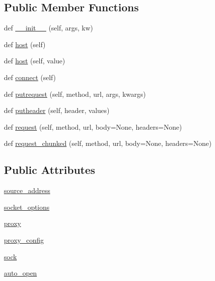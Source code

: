 \subsection*{Public Member Functions}
\begin{DoxyCompactItemize}
\item 
def \hyperlink{classpip_1_1__vendor_1_1urllib3_1_1connection_1_1HTTPConnection_ad63fe1e5e68008fee982ea14c3f31606}{\+\_\+\+\_\+init\+\_\+\+\_\+} (self, args, kw)
\item 
def \hyperlink{classpip_1_1__vendor_1_1urllib3_1_1connection_1_1HTTPConnection_ad3b2b3f74cfd3ac1d9288c40e86dbfca}{host} (self)
\item 
def \hyperlink{classpip_1_1__vendor_1_1urllib3_1_1connection_1_1HTTPConnection_a68587ff6bb26a75d8bea4a96dd1237f3}{host} (self, value)
\item 
def \hyperlink{classpip_1_1__vendor_1_1urllib3_1_1connection_1_1HTTPConnection_a303347a3223952a6860e9d3ae44a2ba3}{connect} (self)
\item 
def \hyperlink{classpip_1_1__vendor_1_1urllib3_1_1connection_1_1HTTPConnection_a611c9e37436696a1af29ac624ea77def}{putrequest} (self, method, url, args, kwargs)
\item 
def \hyperlink{classpip_1_1__vendor_1_1urllib3_1_1connection_1_1HTTPConnection_a9ca92a84ad051041cfd318c6e08d39cd}{putheader} (self, header, values)
\item 
def \hyperlink{classpip_1_1__vendor_1_1urllib3_1_1connection_1_1HTTPConnection_ae44707607a133fa0d27085cc2ea9ef85}{request} (self, method, url, body=None, headers=None)
\item 
def \hyperlink{classpip_1_1__vendor_1_1urllib3_1_1connection_1_1HTTPConnection_ad0ce9861382a0268d64ee1d58d3d83c4}{request\+\_\+chunked} (self, method, url, body=None, headers=None)
\end{DoxyCompactItemize}
\subsection*{Public Attributes}
\begin{DoxyCompactItemize}
\item 
\hyperlink{classpip_1_1__vendor_1_1urllib3_1_1connection_1_1HTTPConnection_abd9f28f7d024b3e544e7b3d3bb9d8a77}{source\+\_\+address}
\item 
\hyperlink{classpip_1_1__vendor_1_1urllib3_1_1connection_1_1HTTPConnection_ad4e19482415e22a06e228552ada6f142}{socket\+\_\+options}
\item 
\hyperlink{classpip_1_1__vendor_1_1urllib3_1_1connection_1_1HTTPConnection_a70e46c5372379c8b6635dc4b618d7ee4}{proxy}
\item 
\hyperlink{classpip_1_1__vendor_1_1urllib3_1_1connection_1_1HTTPConnection_aafe0298528579b9eb8c0c72f6b8504e6}{proxy\+\_\+config}
\item 
\hyperlink{classpip_1_1__vendor_1_1urllib3_1_1connection_1_1HTTPConnection_a6631f9573fa1094b5c85f9af535a8c1c}{sock}
\item 
\hyperlink{classpip_1_1__vendor_1_1urllib3_1_1connection_1_1HTTPConnection_a018e186c223f9de2fc1884bfc6acf012}{auto\+\_\+open}
\end{DoxyCompactItemize}
